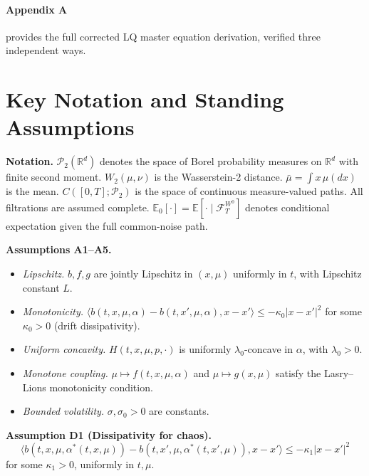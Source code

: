 \paragraph{Appendix A} provides the full corrected LQ master equation derivation,
verified three independent ways.

\section{Key Notation and Standing Assumptions}

\textbf{Notation.}
$\mathcal{P}_2(\mathbb{R}^d)$ denotes the space of Borel probability measures on
$\mathbb{R}^d$ with finite second moment. $W_2(\mu,\nu)$ is the Wasserstein-2
distance. $\bar\mu = \int x\, \mu(dx)$ is the mean. $C([0,T];\mathcal{P}_2)$ is
the space of continuous measure-valued paths. All filtrations are assumed complete.
$\mathbb{E}_0[\cdot] = \mathbb{E}[\cdot \mid \mathcal{F}_T^{W^0}]$ denotes
conditional expectation given the full common-noise path.

\textbf{Assumptions A1--A5.}
\begin{itemize}
    \item[A1.] \textit{Lipschitz.} $b, f, g$ are jointly Lipschitz in $(x,\mu)$
    uniformly in $t$, with Lipschitz constant $L$.
    \item[A2.] \textit{Monotonicity.} $\langle b(t,x,\mu,\alpha) - b(t,x',\mu,\alpha),
    x-x'\rangle \le -\kappa_0|x-x'|^2$ for some $\kappa_0 > 0$ (drift
    dissipativity).
    \item[A3.] \textit{Uniform concavity.} $H(t,x,\mu,p,\cdot)$ is uniformly
    $\lambda_0$-concave in $\alpha$, with $\lambda_0 > 0$.
    \item[A4.] \textit{Monotone coupling.} $\mu \mapsto f(t,x,\mu,\alpha)$ and
    $\mu \mapsto g(x,\mu)$ satisfy the Lasry--Lions monotonicity condition.
    \item[A5.] \textit{Bounded volatility.} $\sigma, \sigma_0 > 0$ are constants.
\end{itemize}

\textbf{Assumption D1 (Dissipativity for chaos).}
\[
    \langle b(t,x,\mu,\alpha^*(t,x,\mu)) - b(t,x',\mu,\alpha^*(t,x',\mu)), x-x'\rangle
    \le -\kappa_1|x-x'|^2
\]
for some $\kappa_1 > 0$, uniformly in $t, \mu$.
